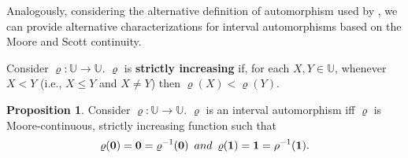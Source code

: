 \documentclass[conference]{IEEEtran}
\theoremstyle{plain}
\newtheorem{theorem}{Theorem}[section]
\newtheorem{corollary}[theorem]{Corollary}
\theoremstyle{remark}
\theoremstyle{definition}
\theoremstyle{proposition}
\newtheorem{proposition}[theorem]{Proposition}
\newcommand{\UU}{\mathbb{U} }
\begin{document}
%
%
Analogously, considering the  alternative definition  of
automorphism used by \cite{BBS03},  we   can  provide alternative
characterizations  for interval automorphisms based on the Moore
and Scott continuity.


Consider $\varrho:\UU\rightarrow \UU$. $\varrho$ is {\bf strictly
increasing} if, for each $X,Y\in \UU$, whenever $X< Y$ (i.e.,
$X\leq Y$ and $X\neq Y$) then $\varrho(X)<\varrho(Y)$.

\begin{proposition}\cite[Proposition 5.1]{BT06a}
Consider $\varrho:\UU\rightarrow \UU$. $\varrho$ is  an interval
automorphism iff $\varrho$ is Moore-continuous, strictly
increasing function such that
\begin{equation}\label{eq-extrem-auto}
\varrho(\textbf{0})=\textbf{0} = \varrho^{-1}(\textbf{0}) \mbox{\,\,\, and \,\,\,} \varrho(\textbf{1})=\textbf{1}=\rho^{-1}(\textbf{1}).
\end{equation}
\end{proposition}
%
%
%


\end{document}
